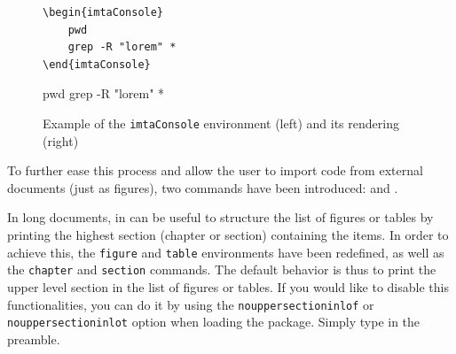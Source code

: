 \documentclass{report}
\begin{document}
\begin{figure}[!ht]
\begin{minipage}{.45\linewidth}
\renewcommand{\theFancyVerbLine}{\texttt{\textcolor{gray!150}{\normalsize \oldstylenums{\arabic{FancyVerbLine}}}}}%
\vspace{0.5\baselineskip}%
\begin{mdframed}[backgroundcolor=imtaCodeLinenosFrame, innerrightmargin=0pt, innertopmargin=0pt, innerbottommargin=0pt, linewidth=1pt]
\begin{mdframed}[backgroundcolor=imtaCodeBackground, skipabove=0pt, skipbelow=0pt, rightmargin=0pt, leftmargin=3ex, linewidth=0pt, innertopmargin=5pt, innerbottommargin=5pt, innerleftmargin=1ex]%
\begin{verbatim}
\begin{imtaConsole}
    pwd
    grep -R "lorem" *
\end{imtaConsole}
\end{verbatim}
\end{mdframed}
\end{mdframed}
\end{minipage}
\hfill
\begin{minipage}{.45\linewidth}
\vspace{2em}
\begin{imtaConsole}
pwd
grep -R "lorem" *
\end{imtaConsole}
\end{minipage}
\caption{Example of the \texttt{imtaConsole} environment (left) and its rendering (right)\label{fig:imtaCode}}
\end{figure}

To further ease this process and allow the user to import code from external documents (just as figures), two commands have been introduced:  and .



In long documents, in can be useful to structure the list of figures or tables by printing the highest section (chapter or section) containing the items. 
In order to achieve this, the \texttt{figure} and \texttt{table} environments have been redefined, as well as the \texttt{chapter} and \texttt{section} commands. 
The default behavior is thus to print the upper level section in the list of figures or tables. 
If you would like to disable this functionalities, you can do it by using the \texttt{nouppersectioninlof} or \texttt{nouppersectioninlot} option when loading the package. Simply type  in the preamble.
\end{document}

